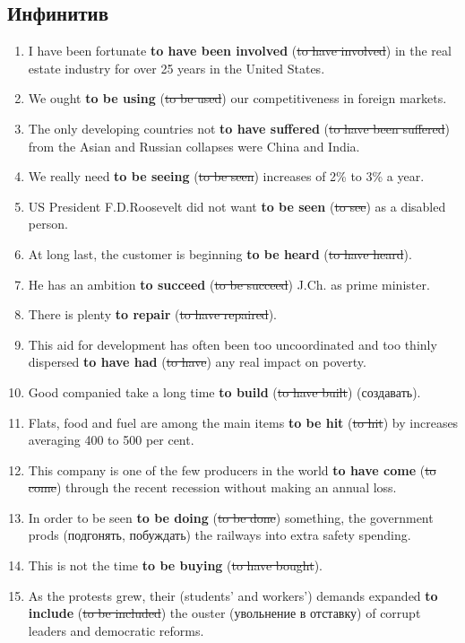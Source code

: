 \documentclass[main.tex]{subfiles}
\begin{document}
\subsection{Инфинитив}


\begin{enumerate}[nosep,leftmargin=*]
	\item I have been fortunate \textbf{to have been involved} (\st{to have involved}) in the real estate industry for over 25 years in the United States.
	\item We ought \textbf{to be using} (\st{to be used}) our competitiveness in foreign markets.
	\item The only developing countries not \textbf{to have suffered} (\st{to have been suffered}) from the Asian and Russian collapses were China and India.
	\item We really need \textbf{to be seeing} (\st{to be seen}) increases of 2\% to 3\% a year.
	\item US President F.D.Roosevelt did not want \textbf{to be seen} (\st{to see}) as a disabled person.
	\item At long last, the customer is beginning \textbf{to be heard} (\st{to have heard}).
	\item He has an ambition \textbf{to succeed} (\st{to be succeed}) J.Ch. as prime minister.
	\item There is plenty \textbf{to repair} (\st{to have repaired}).
	\item This aid for development has often been too uncoordinated and too thinly dispersed \textbf{to have had} (\st{to have}) any real impact on poverty.
	\item Good companied take a long time \textbf{to build} (\st{to have built}) (создавать).
	\item Flats, food and fuel are among the main items \textbf{to be hit} (\st{to hit}) by increases averaging 400 to 500 per cent.
	\item This company is one of the few producers in the world \textbf{to have come} (\st{to come}) through the recent recession without making an annual loss.
	\item In order to be seen \textbf{to be doing} (\st{to be done}) something, the government prods (подгонять, побуждать) the railways into extra safety spending.
	\item This is not the time \textbf{to be buying} (\st{to have bought}).
	\item As the protests grew, their (students' and workers') demands expanded \textbf{to include} (\st{to be included}) the ouster (увольнение в отставку) of corrupt leaders and democratic reforms.

\end{enumerate}
\end{document}
